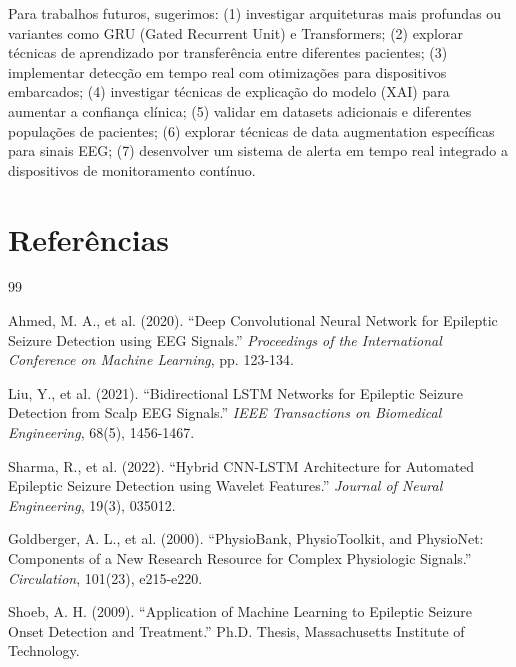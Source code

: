 \documentclass[12pt,a4paper]{article}
\begin{document}
Para trabalhos futuros, sugerimos: (1) investigar arquiteturas mais profundas ou variantes como GRU (Gated Recurrent Unit) e Transformers; (2) explorar técnicas de aprendizado por transferência entre diferentes pacientes; (3) implementar detecção em tempo real com otimizações para dispositivos embarcados; (4) investigar técnicas de explicação do modelo (XAI) para aumentar a confiança clínica; (5) validar em datasets adicionais e diferentes populações de pacientes; (6) explorar técnicas de data augmentation específicas para sinais EEG; (7) desenvolver um sistema de alerta em tempo real integrado a dispositivos de monitoramento contínuo.

\section*{Referências}

\begin{thebibliography}{99}

Ahmed, M. A., et al. (2020). ``Deep Convolutional Neural Network for Epileptic Seizure Detection using EEG Signals.'' \textit{Proceedings of the International Conference on Machine Learning}, pp. 123-134.

Liu, Y., et al. (2021). ``Bidirectional LSTM Networks for Epileptic Seizure Detection from Scalp EEG Signals.'' \textit{IEEE Transactions on Biomedical Engineering}, 68(5), 1456-1467.

Sharma, R., et al. (2022). ``Hybrid CNN-LSTM Architecture for Automated Epileptic Seizure Detection using Wavelet Features.'' \textit{Journal of Neural Engineering}, 19(3), 035012.

Goldberger, A. L., et al. (2000). ``PhysioBank, PhysioToolkit, and PhysioNet: Components of a New Research Resource for Complex Physiologic Signals.'' \textit{Circulation}, 101(23), e215-e220.

Shoeb, A. H. (2009). ``Application of Machine Learning to Epileptic Seizure Onset Detection and Treatment.'' Ph.D. Thesis, Massachusetts Institute of Technology.

\end{thebibliography}
\end{document}
